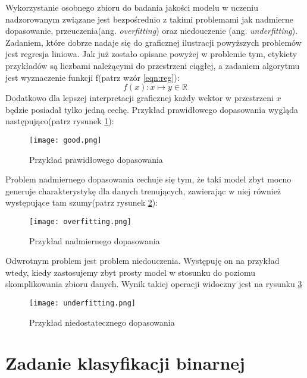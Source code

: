 Wykorzystanie osobnego zbioru do badania jakości modelu w uczeniu nadzorowanym związane jest bezpośrednio z takimi problemami jak nadmierne dopasowanie, przeuczenia(ang. \textit{overfitting}) oraz niedouczenie (ang. \textit{underfitting})\cite{hands_on}. Zadaniem, które dobrze nadaje się do graficznej ilustracji powyższych problemów jest regresja liniowa. Jak już zostało opisane powyżej w problemie tym, etykiety
przykładów są liczbami należącymi do przestrzeni ciągłej, a zadaniem algorytmu jest wyznaczenie funkcji f(patrz wzór \ref{eqn:reg}):
\begin{equation}
f(x): x \mapsto y \in \mathbb{R}
\label{eqn:reg}
\end{equation}
Dodatkowo dla lepszej interpretacji graficznej każdy wektor w przestrzeni $x$ będzie posiadał tylko jedną cechę. Przykład prawidłowego dopasowania wygląda następująco(patrz rysunek \ref{fig:probki}):

\begin{figure}[h!]
	\texttt{[image: good.png]}
	\centering
	\caption{Przykład prawidłowego dopasowania}
	\label{fig:probki}
\end{figure}

Problem nadmiernego dopasowania cechuje się tym, że taki model zbyt mocno generuje charakterystykę dla danych trenujących, zawierając w niej również występujące tam szumy(patrz rysunek \ref{fig:overfitting}):

\begin{figure}[h!]
	\texttt{[image: overfitting.png]}
	\centering
	\caption{Przykład nadmiernego dopasowania}
	\label{fig:overfitting}
\end{figure}

Odwrotnym problem jest problem niedouczenia. Występuję on na przykład wtedy, kiedy zastosujemy zbyt prosty model w stosunku do poziomu skomplikowania zbioru danych. Wynik takiej operacji widoczny jest na rysunku \ref{fig:underfitting} 

\begin{figure}[h!]
	\texttt{[image: underfitting.png]}
	\centering
	\caption{Przykład niedostatecznego dopasowania}
	\label{fig:underfitting}
\end{figure}

\section{Zadanie klasyfikacji binarnej}

